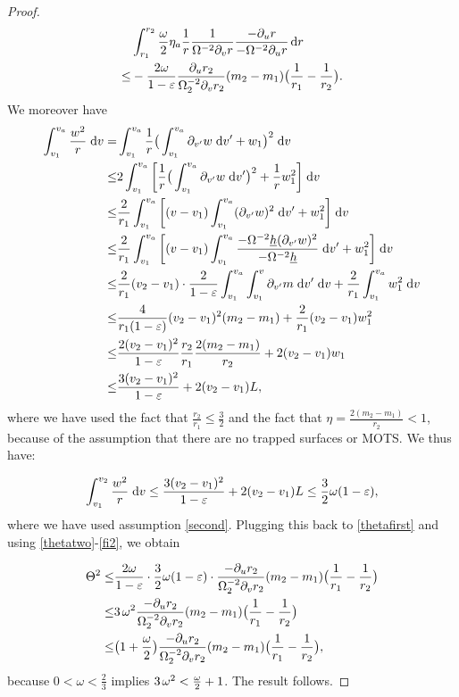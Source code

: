 \documentclass{article}[11pt]
\newcommand{\hsp}{\hspace{.5mm}}
\newcommand{\hb}{\underline{h}}
\newcommand{\inta}{\int_{v_1}^{v_a}}
\newcommand{\dv}{\hspace{1mm}\text{d}v}
\newcommand{\dvprime}{\hspace{1mm} \text{d}v^{\prime}}
\numberwithin{equation}{section}
\begin{document}
\begin{proof}
\begin{align} \label{thetatwo}
&\int_{r_1}^{r_2} \frac{\omega}{2}\eta_a\frac{1}{r}\frac{1}{\Omega^{-2}\partial_v r}\frac{-\partial_u r}{-\Omega^{-2}\partial_u r} \hsp \text{d}r\notag \\ \leq& - \frac{2\omega}{1-\varepsilon}\frac{\partial_u r_2}{\Omega_{2}^{-2}\partial_v r_2}(m_2-m_1)\big(\frac{1}{r_1}-\frac{1}{r_2}\big).
\end{align}We moreover have \begin{align}
\inta \frac{w^2}{r} \dv = &\inta \frac{1}{r} \big(\inta \partial_{v^{\prime}}w\hspace{1mm} \text{d}v^{\prime} +w_1\big)^2 \dv \notag \\ \leq& 2 \inta \bigg[ \frac{1}{r}\big(\inta \partial_{v^{\prime}}w \dvprime\big)^2 +\frac{1}{r} w_1^2 \bigg] \dv \notag \\ \leq& \frac{2}{r_1} \inta \bigg[ (v-v_1) \inta (\partial_{v^{\prime}}w)^2 \dvprime +w_1^2 \bigg] \dv \notag\\ \leq& \frac{2}{r_1} \inta \bigg[ (v-v_1) \inta \frac{-\Omega^{-2}\hb (\partial_{v^{\prime}}w)^2}{-\Omega^{-2}\hb} \dvprime +w_1^2 \bigg] \dv \notag\\ \leq& \frac{2}{r_1}(v_2-v_1) \cdot \frac{2}{1-\varepsilon}\inta \int_{v_1}^v \partial_{v^{\prime}}m \hspace{1mm} \text{d}v^{\prime}\dv +\frac{2}{r_1} \inta w_1^2 \dv \notag \\ \leq& \frac{4}{r_1(1-\varepsilon)}(v_2-v_1)^2 (m_2-m_1) +\frac{2}{r_1}(v_2-v_1) w_1^2\notag \\ \leq& \frac{2(v_2-v_1)^2}{1-\varepsilon} \frac{r_2}{r_1}\frac{2 (m_2-m_1)}{r_2} + 2(v_2-v_1) w_1 \notag \\ \leq& \frac{3 (v_2-v_1)^2}{1-\varepsilon}+ 2(v_2-v_1)L, \label{fi2}
\end{align}where we have used the fact that $\frac{r_2}{r_1}\leq \frac{3}{2}$ and the fact that $\eta = \frac{2(m_2-m_1)}{r_2}<1$, because of the assumption that there are no trapped surfaces or MOTS. We thus have:

\begin{align}
\int_{v_1}^{v_2} \frac{w^2}{r} \dv \leq \frac{3 (v_2-v_1)^2}{1-\varepsilon}+ 2(v_2-v_1)L\leq \frac{3}{2}\omega (1-\varepsilon) ,
\end{align}where we have used assumption \eqref{second}. Plugging this back to \eqref{thetafirst} and using \eqref{thetatwo}-\eqref{fi2}, we obtain

\begin{align}
\Theta^2 \leq& \frac{2\omega}{1-\varepsilon}\cdot \frac{3}{2} \omega (1-\varepsilon)\cdot  \frac{-\partial_u r_2}{\Omega_{2}^{-2}\partial_v r_2}(m_2-m_1)\big(\frac{1}{r_1}-\frac{1}{r_2}\big)\notag \\ \leq& 3\hsp \omega^2 \frac{-\partial_u r_2}{\Omega_{2}^{-2}\partial_v r_2}(m_2-m_1)\big(\frac{1}{r_1}-\frac{1}{r_2}\big)\notag \\ \leq& \big(1+\frac{\omega}{2}\big) \frac{-\partial_u r_2}{\Omega_{2}^{-2}\partial_v r_2}(m_2-m_1)\big(\frac{1}{r_1}-\frac{1}{r_2}\big),\notag
\end{align}because $0<\omega<\frac{2}{3}$ implies $3\hsp \omega^2< \frac{\omega}{2}+1$. The result follows. 



\end{proof}
\end{document}
